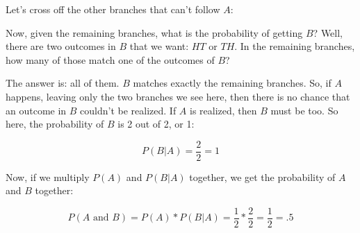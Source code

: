 \documentclass[../../../main.tex]{subfiles}
\begin{document}
\noindent
Let's cross off the other branches that can't follow $A$:

\begin{center}
\end{center}

\noindent
Now, given the remaining branches, what is the probability of getting $B$? Well, there are two outcomes in $B$ that we want: $HT$ or $TH$. In the remaining branches, how many of those match one of the outcomes of $B$? 

The answer is: all of them. $B$ matches exactly the remaining branches. So, if $A$ happens, leaving only the two branches we see here, then there is no chance that an outcome in $B$ couldn't be realized. If $A$ is realized, then $B$ must be too. So here, the probability of $B$ is 2 out of 2, or 1:

\begin{equation*}
  P(B | A) = \frac{2}{2} = 1
\end{equation*}

\noindent
Now, if we multiply $P(A)$ and $P(B | A)$ together, we get the probability of $A$ and $B$ together:

\begin{equation*}
  P(A \text{ and } B) = P(A) * P(B | A) = \frac{1}{2} * \frac{2}{2} = \frac{1}{2} = .5
\end{equation*}
\end{document}
